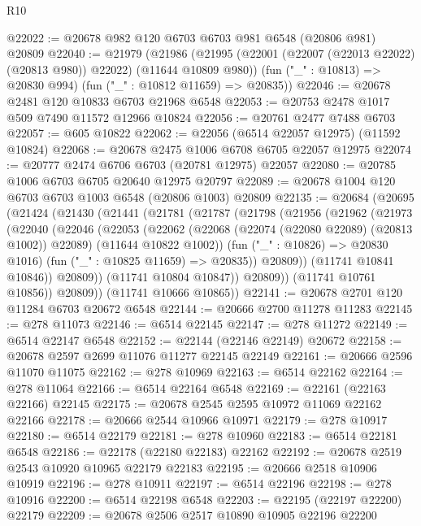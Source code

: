 \begin{lexlean}{R10}
\begin{coremodule}
@22022 := @20678 @982 @120 @6703 @6703 @981 @6548 (@20806 @981) @20809
@22040 := @21979
    (@21986
      (@21995 (@22001 (@22007 (@22013 @22022) (@20813 @980)) @22022) (@11644 @10809 @980))
      (fun ("_" : @10813) => @20830 @994)
      (fun ("_" : @10812 @11659) => @20835))
@22046 := @20678 @2481 @120 @10833 @6703 @21968 @6548
@22053 := @20753 @2478 @1017 @509 @7490 @11572 @12966 @10824
@22056 := @20761 @2477 @7488 @6703
@22057 := @605 @10822
@22062 := @22056 (@6514 @22057 @12975) (@11592 @10824)
@22068 := @20678 @2475 @1006 @6708 @6705 @22057 @12975
@22074 := @20777 @2474 @6706 @6703 (@20781 @12975) @22057
@22080 := @20785 @1006 @6703 @6705 @20640 @12975 @20797
@22089 := @20678 @1004 @120 @6703 @6703 @1003 @6548 (@20806 @1003) @20809
@22135 := @20684
    (@20695
      (@21424
        (@21430
          (@21441
            (@21781
              (@21787
                (@21798
                  (@21956
                    (@21962
                      (@21973
                        (@22040
                          (@22046
                            (@22053
                              (@22062
                                (@22068 (@22074 (@22080 @22089) (@20813 @1002)) @22089)
                                (@11644 @10822 @1002))
                              (fun ("_" : @10826) => @20830 @1016)
                              (fun ("_" : @10825 @11659) => @20835))
                            @20809))
                        (@11741 @10841 @10846))
                      @20809))
                  (@11741 @10804 @10847))
                @20809))
            (@11741 @10761 @10856))
          @20809))
      (@11741 @10666 @10865))
@22141 := @20678 @2701 @120 @11284 @6703 @20672 @6548
@22144 := @20666 @2700 @11278 @11283
@22145 := @278 @11073
@22146 := @6514 @22145
@22147 := @278 @11272
@22149 := @6514 @22147 @6548
@22152 := @22144 (@22146 @22149) @20672
@22158 := @20678 @2597 @2699 @11076 @11277 @22145 @22149
@22161 := @20666 @2596 @11070 @11075
@22162 := @278 @10969
@22163 := @6514 @22162
@22164 := @278 @11064
@22166 := @6514 @22164 @6548
@22169 := @22161 (@22163 @22166) @22145
@22175 := @20678 @2545 @2595 @10972 @11069 @22162 @22166
@22178 := @20666 @2544 @10966 @10971
@22179 := @278 @10917
@22180 := @6514 @22179
@22181 := @278 @10960
@22183 := @6514 @22181 @6548
@22186 := @22178 (@22180 @22183) @22162
@22192 := @20678 @2519 @2543 @10920 @10965 @22179 @22183
@22195 := @20666 @2518 @10906 @10919
@22196 := @278 @10911
@22197 := @6514 @22196
@22198 := @278 @10916
@22200 := @6514 @22198 @6548
@22203 := @22195 (@22197 @22200) @22179
@22209 := @20678 @2506 @2517 @10890 @10905 @22196 @22200

\end{coremodule}
\end{lexlean}
